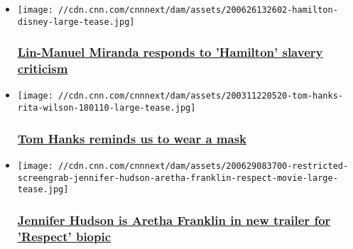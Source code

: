 \begin{itemize}
\item
  \href{/2020/07/07/entertainment/lin-manuel-miranda-hamilton-slavery/index.html}{}

  \texttt{[image: //cdn.cnn.com/cnnnext/dam/assets/200626132602-hamilton-disney-large-tease.jpg]}

  \hypertarget{lin-manuel-miranda-responds-to-hamilton-slavery-criticism}{%
  \subsubsection{\texorpdfstring{\href{/2020/07/07/entertainment/lin-manuel-miranda-hamilton-slavery/index.html}{Lin-Manuel
  Miranda responds to 'Hamilton' slavery
  criticism}}{Lin-Manuel Miranda responds to 'Hamilton' slavery criticism}}\label{lin-manuel-miranda-responds-to-hamilton-slavery-criticism}}
\item
  \href{/2020/07/01/entertainment/tom-hanks-mask-coronavirus/index.html}{}

  \texttt{[image: //cdn.cnn.com/cnnnext/dam/assets/200311220520-tom-hanks-rita-wilson-180110-large-tease.jpg]}

  \hypertarget{tom-hanks-reminds-us-to-wear-a-mask}{%
  \subsubsection{\texorpdfstring{\href{/2020/07/01/entertainment/tom-hanks-mask-coronavirus/index.html}{Tom
  Hanks reminds us to wear a
  mask}}{Tom Hanks reminds us to wear a mask}}\label{tom-hanks-reminds-us-to-wear-a-mask}}
\item
  \href{/2020/06/29/entertainment/jennifer-hudson-aretha-franklin-trnd/index.html}{}

  \texttt{[image: //cdn.cnn.com/cnnnext/dam/assets/200629083700-restricted-screengrab-jennifer-hudson-aretha-franklin-respect-movie-large-tease.jpg]}

  \hypertarget{jennifer-hudson-is-aretha-franklin-in-new-trailer-for-respect-biopic}{%
  \subsubsection{\texorpdfstring{\href{/2020/06/29/entertainment/jennifer-hudson-aretha-franklin-trnd/index.html}{Jennifer
  Hudson is Aretha Franklin in new trailer for 'Respect'
  biopic}}{Jennifer Hudson is Aretha Franklin in new trailer for 'Respect' biopic}}\label{jennifer-hudson-is-aretha-franklin-in-new-trailer-for-respect-biopic}}
\end{itemize}

